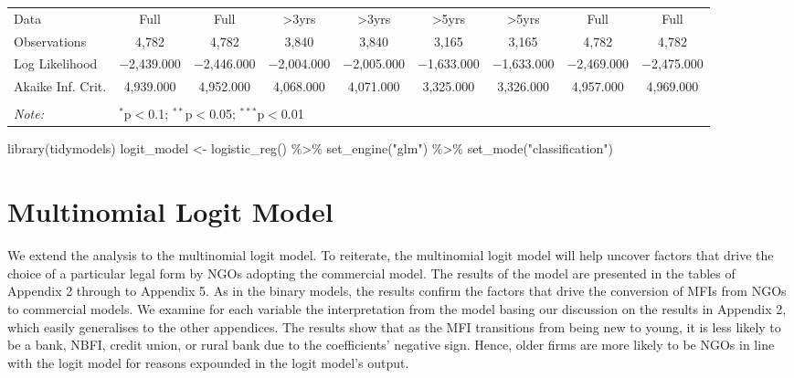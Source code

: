 \documentclass[a4paper,nobind]{templates/ociamthesis}
\newenvironment{Shaded}{\begin{snugshade}}{\end{snugshade}}
\newcommand{\FunctionTok}[1]{\textcolor[rgb]{0.00,0.00,0.00}{#1}}
\newcommand{\NormalTok}[1]{#1}
\newcommand{\OtherTok}[1]{\textcolor[rgb]{0.56,0.35,0.01}{#1}}
\newcommand{\SpecialCharTok}[1]{\textcolor[rgb]{0.00,0.00,0.00}{#1}}
\newcommand{\StringTok}[1]{\textcolor[rgb]{0.31,0.60,0.02}{#1}}
\renewenvironment{Shaded}
{
  \vspace{10pt}%
  \begin{snugshade}%
}{%
  \end{snugshade}%
  \vspace{8pt}%
}
\begin{document}
\begin{landscape}
\begin{table}[!htbp]
\begin{tabular}{@{\extracolsep{5pt}}lcccccccc}
Data & Full & Full & >3yrs & >3yrs & >5yrs & >5yrs & Full & Full \\ 
Observations & 4,782 & 4,782 & 3,840 & 3,840 & 3,165 & 3,165 & 4,782 & 4,782 \\ 
Log Likelihood & $-$2,439.000 & $-$2,446.000 & $-$2,004.000 & $-$2,005.000 & $-$1,633.000 & $-$1,633.000 & $-$2,469.000 & $-$2,475.000 \\ 
Akaike Inf. Crit. & 4,939.000 & 4,952.000 & 4,068.000 & 4,071.000 & 3,325.000 & 3,326.000 & 4,957.000 & 4,969.000 \\ 
\hline 
\hline \\[-1.8ex] 
\textit{Note:}  & \multicolumn{8}{l}{$^{*}$p$<$0.1; $^{**}$p$<$0.05; $^{***}$p$<$0.01} \\ 
\end{tabular} 
\end{table}

\end{landscape}

\newpage

\begin{Shaded}
\begin{Highlighting}[]
\FunctionTok{library}\NormalTok{(tidymodels)}
\NormalTok{logit\_model }\OtherTok{\textless{}{-}} \FunctionTok{logistic\_reg}\NormalTok{() }\SpecialCharTok{\%\textgreater{}\%} 
  \FunctionTok{set\_engine}\NormalTok{(}\StringTok{"glm"}\NormalTok{) }\SpecialCharTok{\%\textgreater{}\%} 
  \FunctionTok{set\_mode}\NormalTok{(}\StringTok{"classification"}\NormalTok{)}
\end{Highlighting}
\end{Shaded}

\hypertarget{multinomial-logit-model}{%
\section{Multinomial Logit Model}\label{multinomial-logit-model}}

We extend the analysis to the multinomial logit model. To reiterate, the multinomial logit model will help uncover factors that drive the choice of a particular legal form by NGOs adopting the commercial model. The results of the model are presented in the tables of Appendix 2 through to Appendix 5. As in the binary models, the results confirm the factors that drive the conversion of MFIs from NGOs to commercial models. We examine for each variable the interpretation from the model basing our discussion on the results in Appendix 2, which easily generalises to the other appendices. The results show that as the MFI transitions from being new to young, it is less likely to be a bank, NBFI, credit union, or rural bank due to the coefficients' negative sign. Hence, older firms are more likely to be NGOs in line with the logit model for reasons expounded in the logit model's output.
\end{document}
